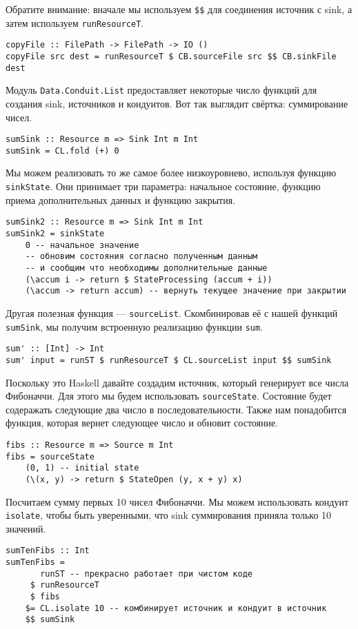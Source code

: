 Обратите внимание: вначале мы используем \verb=$$= для соединения источник с sink, а
затем используем \lstinline=runResourceT=.
\begin{lstlisting}
copyFile :: FilePath -> FilePath -> IO ()
copyFile src dest = runResourceT $ CB.sourceFile src $$ CB.sinkFile dest
\end{lstlisting}
Модуль \lstinline=Data.Conduit.List= предоставляет некоторые число функций для создания
sink,
источников и кондуитов. Вот так выглядит свёртка: суммирование чисел.
\begin{lstlisting}
sumSink :: Resource m => Sink Int m Int
sumSink = CL.fold (+) 0
\end{lstlisting}
Мы можем реализовать то же самое более низкоуровнево, используя функцию \verb=sinkState=.
Они принимает три параметра: начальное состояние, функцию приема дополнительных данных и
функцию закрытия.
\begin{lstlisting}
sumSink2 :: Resource m => Sink Int m Int
sumSink2 = sinkState
    0 -- начальное значение
    -- обновим состояния согласно полученным данным 
    -- и сообщим что необходимы дополнительные данные
    (\accum i -> return $ StateProcessing (accum + i))
    (\accum -> return accum) -- вернуть текущее значение при закрытии
\end{lstlisting}
Другая полезная функция --- \verb=sourceList=. Скомбинировав её с нашей функций
\verb=sumSink=, мы получим встроенную реализацию функции \lstinline=sum=.
\begin{lstlisting}
sum' :: [Int] -> Int
sum' input = runST $ runResourceT $ CL.sourceList input $$ sumSink
\end{lstlisting}
Поскольку это Haskell давайте создадим источник, который генерирует все числа Фибоначчи.
Для этого мы будем использовать \lstinline=sourceState=. Состояние будет содеражать
следующие два
число в последовательности. Также нам понадобится функция, которая вернет следующее число
и обновит состояние.
\begin{lstlisting}
fibs :: Resource m => Source m Int
fibs = sourceState
    (0, 1) -- initial state
    (\(x, y) -> return $ StateOpen (y, x + y) x)
\end{lstlisting}
Посчитаем сумму первых 10 чисел Фибоначчи. Мы можем использовать кондуит \lstinline=isolate=,
чтобы быть уверенными, что sink суммирования приняла только 10 значений.
\begin{lstlisting}sumTenFibs :: Int
sumTenFibs =
       runST -- прекрасно работает при чистом коде
     $ runResourceT
     $ fibs
    $= CL.isolate 10 -- комбинирует источник и кондуит в источник
    $$ sumSink
\end{lstlisting}
